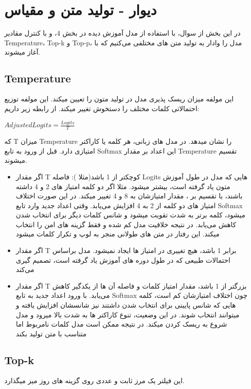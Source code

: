 \documentclass{article}
\begin{document}
\newpage
\section{دیوار - تولید متن و مقیاس }

در این بخش از سوال، با استفاده از مدل آموزش دیده در بخش 4، و با کنترل مقادیر Temperature، Top-k و Top-p، مدل را وادار به تولید متن های مختلفی می‌کنیم که با  آغاز میشوند.
\subsection{Temperature}
این مولفه میزان ریسک پذیری مدل در تولید متون را تعیین میکند. این مولفه توزیع احتمالاتی کلمات مختلف را دستخوش تغییر میکند. از رابطه زیر داریم:
\begin{center}
	$Adjusted Logits = \frac{Logits}{T}$
\end{center}
که T میزان Temperature را نشان میدهد. در مدل های زبانی، هر کلمه یا کاراکتر امتیازی دارد. قبل از ورود به تابع Softmax این اعداد بر مقدار Temperature تقسیم میشوند. 
\begin{itemize}
	\item اگر مقدار T کوچکتر از 1 باشد(مثلا ): فاصله Logits هایی که مدل در طول آموزش متون یاد گرفته است، بیشتر میشود. مثلا اگر دو کلمه امتیاز های 2 و 4 داشته باشند، با تقسیم بر ، مقدار امتیازشان به 8 و 4 تغییر میکند. در این صورت اختلاف امتیاز های دو کلمه از 2 به 4 افزایش می‌یابد. وقتی اعداد جدید وارد تابع Softmax میشود، کلمه برتر به شدت تقویت میشود و شانس کلمات دیگر برای انتخاب شدن کاهش می‌یابد. در نتیجه خلاقیت مدل کم شده و فقط گزینه های امن را انتخاب میکند. این رفتار در متن های طولانی منجر به لوپ و تکرار کلمات میشود
	\item اگر مقدار T برابر 1 باشد، هیچ تغییری در امتیاز ها ایجاد نمیشود. مدل براساس احتمالات طبیعی که در طول دوره های آموزش یاد گرفته است، تصمیم گیری می‌کند
	\item اگر مقدار T بزرگتر از 1 باشد، مقدار امتیاز کلمات و فاصله آن ها از یکدگیر کاهش می‌یابد. با ورود اعداد جدید به تابع Softmax چون اختلاف امتیازشان کم است، کلمه هایی که شانس پایینی برای انتخاب شدن داشتند نیز شانسشان افزایش یافته و میتوانند انتخاب شوند. در این وضعیت، تنوع کاراکتر ها به شدت بالا میرود و مدل شروع به ریسک کردن میکند. در نتیجه ممکن است مدل کلمات نامربوط اما متناسب با متن تولید بکند
\end{itemize}
\subsection{Top-k}
این فیلتر یک مرز ثابت و عددی روی گزینه های روز میز میگذارد.
\end{document}
